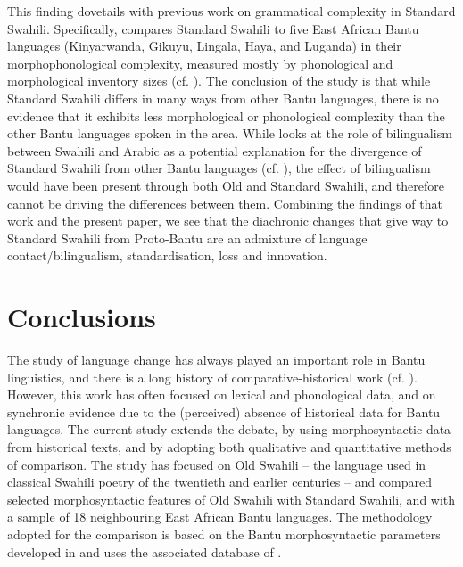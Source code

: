 \documentclass[output=paper]{langscibook}
\begin{document}
This finding dovetails with previous work on grammatical complexity in Standard Swahili.  Specifically, \citet{Jerro2018} compares Standard Swahili to five East African Bantu languages (Kinyarwanda, Gikuyu, Lingala, Haya, and Luganda) in their morphophonological complexity, measured mostly by phonological and morphological inventory sizes (cf. \citealt{Kusters2003, McWhorter2011}). The conclusion of the study is that while Standard Swahili differs in many ways from other Bantu languages, there is no evidence that it exhibits less morphological or phonological complexity than the other Bantu languages spoken in the area. While \citet{Jerro2018} looks at the role of bilingualism between Swahili and Arabic as a potential explanation for the divergence of Standard Swahili from other Bantu languages (cf. \citealt{Trudgill2009,Trudgill2011}), the effect of bilingualism would have been present through both Old and Standard Swahili, and therefore cannot be driving the differences between them. Combining the findings of that work and the present paper, we see that the diachronic changes that give way to Standard Swahili from Proto-Bantu are an admixture of language contact/bilingualism, standardisation, loss and innovation.   

\section{Conclusions}\label{sec:marten:5}

The study of language change has always played an important role in Bantu linguistics, and there is a long history of comparative-historical work (cf. \citealt{vanderSpuyForthcoming}). However, this work has often focused on lexical and phonological data, and on synchronic evidence due to the (perceived) absence of historical data for Bantu languages. The current study extends the debate, by using morphosyntactic data from historical texts, and by adopting both qualitative and quantitative methods of comparison. The study has focused on Old Swahili -- the language used in classical Swahili poetry of the twentieth and earlier centuries -- and compared selected morphosyntactic features of Old Swahili with Standard Swahili, and with a sample of 18 neighbouring East African Bantu languages. The methodology adopted for the comparison is based on the Bantu morphosyntactic parameters developed in \citet{GuéroisEtAl2017} and uses the associated database of \citet{MartenEtAl2018}. 
\end{document}
